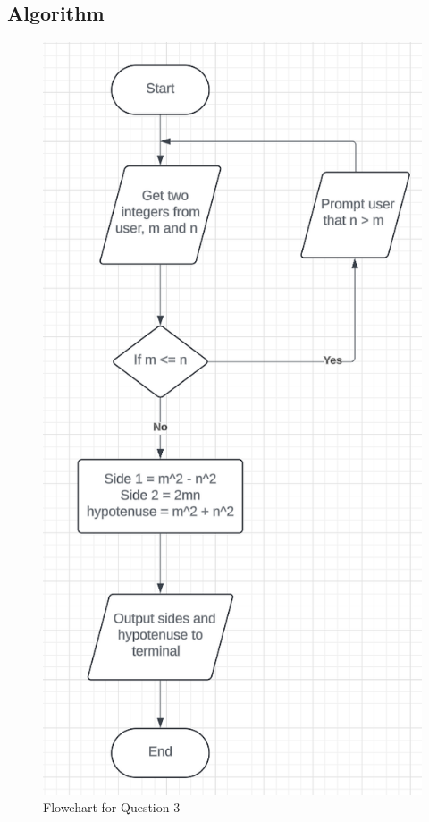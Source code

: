\documentclass{article}
\begin{document}
\begin{flushleft}
	\section{Algorithm}
	\begin{figure}[!h]
		\begin{centering}
			\includegraphics[scale=0.45]{Q3flowchart.png}
			\caption{Flowchart for Question 3}
		\end{centering}
	\end{figure}

\end{flushleft}
\end{document}
